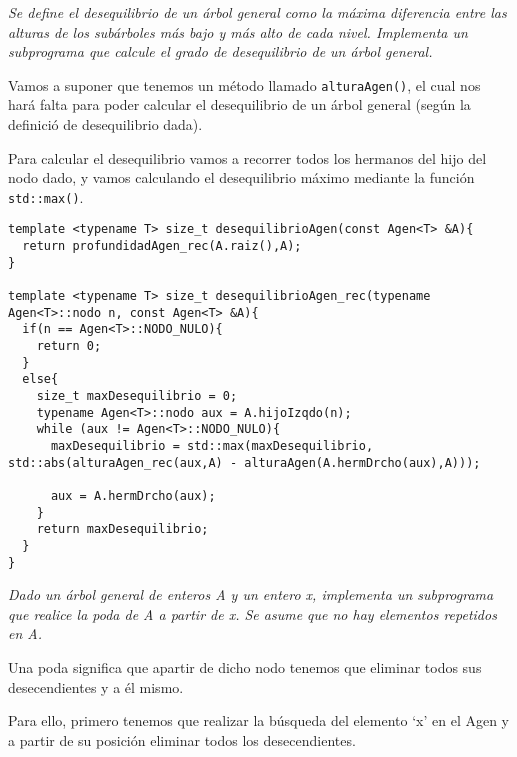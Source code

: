 \textbf{\large{}}\textit{ Se define el desequilibrio de un árbol general como la máxima diferencia entre las alturas de los subárboles más bajo y más alto de cada nivel. Implementa un subprograma que calcule el grado de desequilibrio de un árbol general.}

Vamos a suponer que tenemos un método llamado \texttt{alturaAgen()}, el cual nos hará falta para poder calcular el desequilibrio de un árbol general (según la definició de desequilibrio dada).

Para calcular el desequilibrio vamos a recorrer todos los hermanos del hijo del nodo dado, y vamos calculando el desequilibrio máximo mediante la función \texttt{std::max()}.

\begin{verbatim}
template <typename T> size_t desequilibrioAgen(const Agen<T> &A){
  return profundidadAgen_rec(A.raiz(),A);
}

template <typename T> size_t desequilibrioAgen_rec(typename Agen<T>::nodo n, const Agen<T> &A){
  if(n == Agen<T>::NODO_NULO){
    return 0;
  }
  else{
    size_t maxDesequilibrio = 0;
    typename Agen<T>::nodo aux = A.hijoIzqdo(n);
    while (aux != Agen<T>::NODO_NULO){
      maxDesequilibrio = std::max(maxDesequilibrio, std::abs(alturaAgen_rec(aux,A) - alturaAgen(A.hermDrcho(aux),A)));

      aux = A.hermDrcho(aux);
    }
    return maxDesequilibrio;
  }
}
\end{verbatim}

\textbf{\large{}}\textit{ Dado un árbol general de enteros A y un entero x, implementa un subprograma que realice la poda de A a partir de x. Se asume que no hay elementos repetidos en A.}

Una poda significa que apartir de dicho nodo tenemos que eliminar todos sus desecendientes y a él mismo.

Para ello, primero tenemos que realizar la búsqueda del elemento `x' en el Agen y a partir de su posición eliminar todos los desecendientes.

